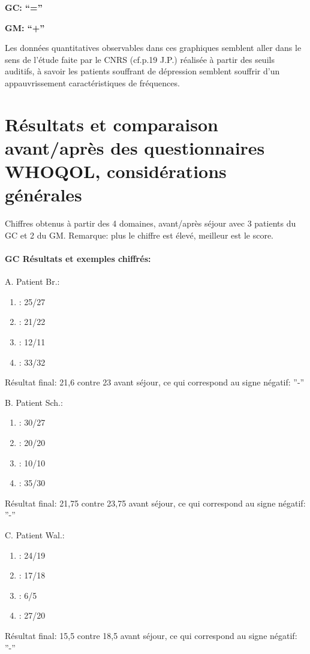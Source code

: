           \textbf{GC:  ``=''}

          \textbf{GM: ``+''}

          
          
Les données quantitatives observables dans ces graphiques semblent aller dans le
sens de  l'étude faite par le
CNRS (cf.p.19 J.P.) réalisée à partir des seuils auditifs, à savoir
les patients souffrant de dépression semblent souffrir d'un
appauvrissement caractéristiques de fréquences.


\section{Résultats et comparaison avant/après des questionnaires WHOQOL,
  considérations générales}

Chiffres obtenus à partir des 4
domaines, avant/après séjour avec 3 patients du GC et 2 du GM.
Remarque: plus le chiffre est élevé, meilleur est le score.
\paragraph{ GC Résultats et exemples chiffrés:}



A. Patient Br.:

	\begin{enumerate}
 		\item : 25/27 
 		\item : 21/22
 		\item : 12/11
 		\item : 33/32
                \end{enumerate}
                
        Résultat final: 21,6 contre 23 avant séjour,  ce qui
        correspond au signe négatif: ''-''

        
        B. Patient Sch.:

	\begin{enumerate}
 		\item : 30/27 
 		\item : 20/20
 		\item : 10/10
 		\item : 35/30
         \end{enumerate}
                Résultat final: 21,75 contre 23,75 avant séjour, ce qui
        correspond au signe négatif: ''-''

                
                C. Patient Wal.:
	\begin{enumerate}
 		\item : 24/19
 		\item : 17/18
 		\item : 6/5
 		\item : 27/20
 	\end{enumerate}
        Résultat final: 15,5 contre 18,5 avant séjour, ce qui
        correspond au signe négatif: ''-''

